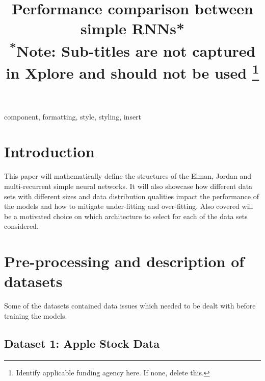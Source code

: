 \documentclass[conference]{IEEEtran}
\begin{document}
\title{Performance comparison between simple RNNs*\\
{\footnotesize \textsuperscript{*}Note: Sub-titles are not captured in Xplore and
should not be used}
\thanks{Identify applicable funding agency here. If none, delete this.}
}

\author{

}

\maketitle

\begin{abstract}
\end{abstract}

\begin{IEEEkeywords}
component, formatting, style, styling, insert
\end{IEEEkeywords}

\section{Introduction}


This paper will mathematically define the structures of the Elman, Jordan and multi-recurrent simple neural networks. It will also showcase how different data sets with different sizes and data distribution qualities impact the performance of the models and how to mitigate under-fitting and over-fitting. Also covered will be a motivated choice on which architecture to select for each of the data sets considered.

\section{Pre-processing and description of datasets}

Some of the datasets contained data issues which needed to be dealt with before training the models.

\subsection{Dataset 1: Apple Stock Data}
\end{document}
